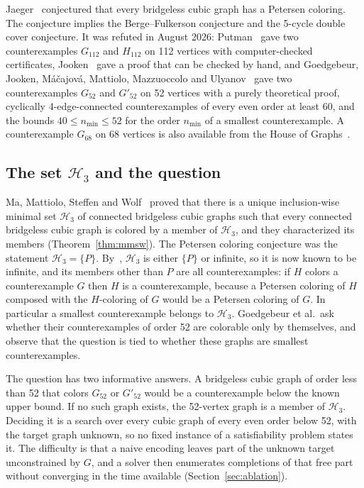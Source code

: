 \documentclass[11pt]{article}
\theoremstyle{definition}
\theoremstyle{remark}
\newcommand{\PG}{P}
\newcommand{\Hthree}{\mathcal{H}_3}
\newcommand{\Ga}{G_{52}}
\newcommand{\Gb}{G'_{52}}
\newcommand{\Gsix}{G_{68}}
\newcommand{\Gmain}{G_{112}}
\newcommand{\Gsym}{H_{112}}
\begin{document}
Jaeger~\cite{Jaeger1988} conjectured that every bridgeless cubic graph has a Petersen coloring.
The conjecture implies the Berge--Fulkerson conjecture and the 5-cycle double cover conjecture.
It was refuted in August 2026: Putman~\cite{Putman2026} gave two counterexamples $\Gmain$ and
$\Gsym$ on 112 vertices with computer-checked certificates, Jooken~\cite{Jooken2026} gave a proof that
can be checked by hand, and Goedgebeur, Jooken, M\'a\v{c}ajov\'a, Mattiolo, Mazzuoccolo and
Ulyanov~\cite{GJMMMU2026} gave two counterexamples $\Ga$ and $\Gb$ on 52 vertices with a purely
theoretical proof, cyclically 4-edge-connected counterexamples of every even order at least 60,
and the bounds $40 \le n_{\min} \le 52$ for the order $n_{\min}$ of a smallest counterexample. A
counterexample $\Gsix$ on 68 vertices is also available from the House of
Graphs~\cite{HoG}.

\subsection{The set \texorpdfstring{$\Hthree$}{H3} and the question}

Ma, Mattiolo, Steffen and Wolf~\cite{MMSW2025} proved that there is a unique inclusion-wise
minimal set $\Hthree$ of connected bridgeless cubic graphs such that every connected bridgeless
cubic graph is colored by a member of $\Hthree$, and they characterized its members
(Theorem~\ref{thm:mmsw}). The Petersen coloring conjecture was the statement $\Hthree = \{\PG\}$.
By~\cite{MMSW2025}, $\Hthree$ is either $\{\PG\}$ or infinite, so it is now known to be infinite, and
its members other than $\PG$ are all counterexamples: if $H$ colors a counterexample $G$ then $H$ is
a counterexample, because a Petersen coloring of $H$ composed with the $H$-coloring of $G$ would be
a Petersen coloring of $G$. In particular a smallest counterexample belongs to $\Hthree$.
Goedgebeur et al.\ ask~\cite[Section~5.4]{GJMMMU2026} whether their counterexamples of order 52
are colorable only by themselves, and observe that the question is tied to whether these graphs
are smallest counterexamples.

The question has two informative answers. A bridgeless cubic graph of order less than 52 that
colors $\Ga$ or $\Gb$ would be a counterexample below the known upper bound. If no such graph
exists, the 52-vertex graph is a member of $\Hthree$. Deciding it is a search over every cubic graph
of every even order below 52, with the target graph unknown, so no fixed instance of a satisfiability
problem states it. The difficulty is that a naive encoding leaves part of the unknown target
unconstrained by $G$, and a solver then enumerates completions of that free part without converging in the time available
(Section~\ref{sec:ablation}).
\end{document}
